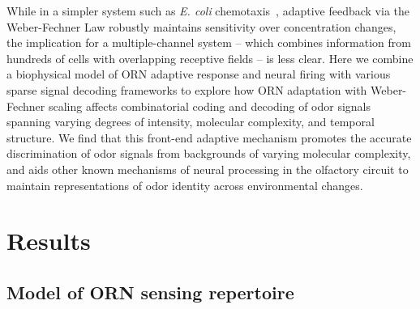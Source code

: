 \documentclass[9pt,lineno]{elife}
\begin{document}
While in a simpler system such as \textit{E. coli} chemotaxis~\citep{EmonetReview}, adaptive feedback via the Weber-Fechner Law robustly maintains sensitivity over concentration changes, the implication for a multiple-channel system -- which combines information from hundreds of cells with overlapping receptive fields  -- is less clear. Here we combine a biophysical model of ORN adaptive response and neural firing with various sparse signal decoding frameworks to explore how ORN adaptation with Weber-Fechner scaling affects combinatorial coding and decoding of odor signals spanning varying degrees of intensity, molecular complexity, and temporal structure. We find that this front-end adaptive mechanism promotes the accurate discrimination of odor signals from backgrounds of varying molecular complexity, and aids other known mechanisms of neural processing in the olfactory circuit to maintain representations of odor identity across environmental changes. %





\section{Results}





\subsection{Model of ORN sensing repertoire}
\end{document}
